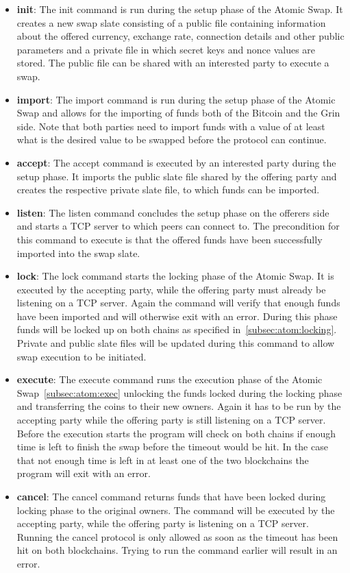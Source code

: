 \begin{itemize}
    \item \textbf{init}: The init command is run during the setup phase of the Atomic Swap.
    It creates a new swap slate consisting of a public file containing information about the offered currency, exchange rate, connection details and other public parameters and a private file in which secret keys and nonce values are stored.
    The public file can be shared with an interested party to execute a swap.
    \item \textbf{import}: The import command is run during the setup phase of the Atomic Swap and allows for the importing of funds both of the Bitcoin and the Grin side.
    Note that both parties need to import funds with a value of at least what is the desired value to be swapped before the protocol can continue.
    \item \textbf{accept}: The accept command is executed by an interested party during the setup phase.
    It imports the public slate file shared by the offering party and creates the respective private slate file, to which funds can be imported.
    \item \textbf{listen}: The listen command concludes the setup phase on the offerers side and starts a TCP server to which peers can connect to.
    The precondition for this command to execute is that the offered funds have been successfully imported into the swap slate.
    \item \textbf{lock}: The lock command starts the locking phase of the Atomic Swap.
    It is executed by the accepting party, while the offering party must already be listening on a TCP server.
    Again the command will verify that enough funds have been imported and will otherwise exit with an error.
    During this phase funds will be locked up on both chains as specified in~\cref{subsec:atom:locking}.
    Private and public slate files will be updated during this command to allow swap execution to be initiated.
    \item \textbf{execute}: The execute command runs the execution phase of the Atomic Swap~\cref{subsec:atom:exec} unlocking the funds locked during the locking phase and transferring the coins to their new owners.
    Again it has to be run by the accepting party while the offering party is still listening on a TCP server.
    Before the execution starts the program will check on both chains if enough time is left to finish the swap before the timeout would be hit.
    In the case that not enough time is left in at least one of the two blockchains the program will exit with an error.
    \item \textbf{cancel}: The cancel command returns funds that have been locked during locking phase to the original owners.
    The command will be executed by the accepting party, while the offering party is listening on a TCP server.
    Running the cancel protocol is only allowed as soon as the timeout has been hit on both blockchains.
    Trying to run the command earlier will result in an error.
\end{itemize}

